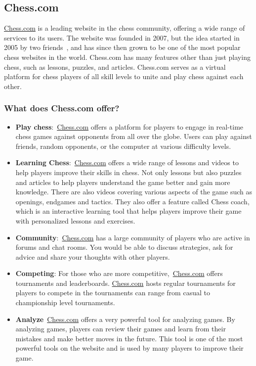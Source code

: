\subsection{Chess.com}\label{subsec:chess-com}

\url{Chess.com} is a leading website in the chess community, offering a wide range of services to its users.
The website was founded in 2007, but the idea started in 2005 by two friends~\cite{Chess.com}, and has since then grown
to be one of the most popular chess websites in the world.
Chess.com has many features other than just playing chess, such as lessons, puzzles, and articles.
Chess.com serves as a virtual platform for chess players of all skill levels to unite and play chess against each other.


\subsubsection{What does Chess.com offer?}\label{subsubsec:what-does-chess-com-offer}

\begin{itemize}
    \item \textbf{Play chess}:~\url{Chess.com} offers a platform for players to engage in real-time chess games against
    opponents from all over the globe.
    Users can play against friends, random opponents, or the computer at various difficulty levels.
    \item \textbf{Learning Chess}:~\url{Chess.com} offers a wide range of lessons and videos to help players
    improve their skills in chess.
    Not only lessons but also puzzles and articles to help players understand the game better and gain more knowledge.
    There are also videos covering various aspects of the game such as openings, endgames and tactics.
    They also offer a feature called Chess coach, which is an interactive learning tool that helps players improve
    their game with personalized lessons and exercises.
    \item \textbf{Community}:~\url{Chess.com} has a large community of players who are active in forums and chat rooms.
    You would be able to discuss strategies, ask for advice and share your thoughts with other players.
    \item \textbf{Competing}: For those who are more competitive,~\url{Chess.com} offers tournaments and leaderboards.
    \url{Chess.com} hosts regular tournaments for players to compete in the tournaments can range from
    casual to championship level tournaments.
    \item \textbf{Analyze}~\url{Chess.com} offers a very powerful tool for analyzing games.
    By analyzing games, players can review their games and learn from their mistakes and make
    better moves in the future.
    This tool is one of the most powerful tools on the website and is used by many players to improve their game.
\end{itemize}
